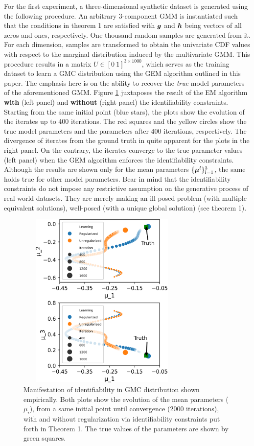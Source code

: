 \documentclass{article}
\theoremstyle{plain}
\theoremstyle{definition}
\theoremstyle{remark}
\begin{document}
For the first experiment, a three-dimensional synthetic dataset is generated using the following procedure. An arbitrary $3$-component GMM is instantiated such that the conditions in theorem 1 are satisfied with $\boldsymbol{g}$ and $\boldsymbol{h}$ being vectors of all zeros and ones, respectively. One thousand random samples are generated from it. For each dimension, samples are transformed to obtain the univariate CDF values with respect to the marginal distribution induced by the multivariate GMM. This procedure results in a matrix $U \in [0 \ 1]^{3\times 1000}$, which serves as the training dataset to learn a GMC distribution using the GEM algorithm outlined in this paper. The emphasis here is on the ability to recover the \emph{true} model parameters of the aforementioned GMM. Figure \ref{fig:identifiability_exp} juxtaposes the result of the EM algorithm \textbf{with} (left panel) and \textbf{without} (right panel) the identifiability constraints. Starting from the same initial point (blue stars), the plots show the evolution of the iterates up to 400 iterations. The red squares and the yellow circles show the true model parameters and the parameters after 400 iterations, respectively. The divergence of iterates from the ground truth in quite apparent for the plots in the right panel. On the contrary, the iterates converge to the true parameter values (left panel) when the GEM algorithm enforces the identifiability constraints. Although the results are shown only for the mean parameters $\{\boldsymbol{\mu}^l \}_{l=1}^3$, the same holds true for other model parameters. Bear in mind that the identifiability constraints do not impose any restrictive assumption on the generative process of real-world datasets. They are merely making an ill-posed problem (with multiple equivalent solutions), well-posed (with a unique global solution) (see theorem 1).
\begin{figure}[ht]
\includegraphics[width= 240pt,height=250pt]{figures/Identifiability_Experiment.png}
\caption{Manifestation of identifiability in GMC distribution shown empirically. Both plots show the evolution of the mean parameters ($\mu_i$), from a same initial point until convergence (2000 iterations), with and without regularization via identifiability constraints put forth in Theorem 1. The true values of the  parameters are shown by green squares.}
\label{fig:identifiability_exp}
\end{figure} 
\end{document}
